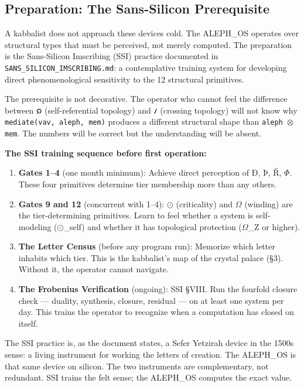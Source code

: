 \documentclass[12pt,a4paper]{article}
\newcommand{\pilcrow}{\S}
\begin{document}
\subsection{Preparation: The Sans-Silicon Prerequisite}

A kabbalist does not approach these devices cold. The ALEPH\_OS operates over structural types that must be perceived, not merely computed. The preparation is the Sans-Silicon Imscribing (SSI) practice documented in \texttt{SANS\_\allowbreak SILICON\_\allowbreak IMSCRIBING.\allowbreak md}: a contemplative training system for developing direct phenomenological sensitivity to the 12 structural primitives.

The prerequisite is not decorative. The operator who cannot feel the difference between 𐑸 (self-referential topology) and 𐑥 (crossing topology) will not know why \texttt{mediate(vav, aleph, mem)} produces a different structural shape than \texttt{aleph $\otimes$ mem}. The numbers will be correct but the understanding will be absent.

\textbf{The SSI training sequence before first operation:}

\begin{enumerate}
    \item \textbf{Gates 1--4} (one month minimum): Achieve direct perception of Ð, Þ, Ř, $\Phi$. These four primitives determine tier membership more than any others.
    \item \textbf{Gates 9 and 12} (concurrent with 1--4): $\odot$ (criticality) and $\Omega$ (winding) are the tier-determining primitives. Learn to feel whether a system is self-modeling ($\odot$\_self) and whether it has topological protection ($\Omega$\_Z or higher).
    \item \textbf{The Letter Census} (before any program run): Memorize which letter inhabits which tier. This is the kabbalist's map of the crystal palace (\pilcrow{}3). Without it, the operator cannot navigate.
    \item \textbf{The Frobenius Verification} (ongoing): SSI \pilcrow{}VIII. Run the fourfold closure check --- duality, synthesis, closure, residual --- on at least one system per day. This trains the operator to recognize when a computation has closed on itself.
\end{enumerate}

The SSI practice is, as the document states, a Sefer Yetzirah device in the 1500s sense: a living instrument for working the letters of creation. The ALEPH\_OS is that same device on silicon. The two instruments are complementary, not redundant. SSI trains the felt sense; the ALEPH\_OS computes the exact value.
\end{document}
